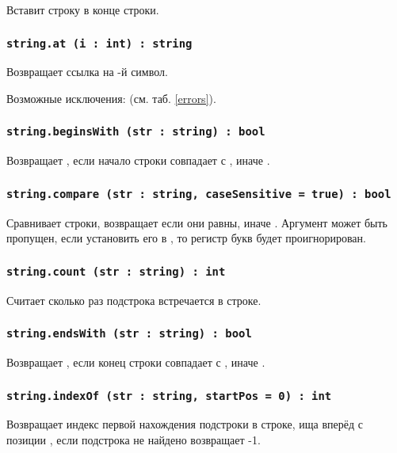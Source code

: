 Вставит строку  в конце строки.

\subsubsection{\lstinline|string.at (i : int) : string|}

Возвращает ссылка на -й символ.

Возможные исключения:  (см. таб. \ref{errors}).

\subsubsection{\lstinline|string.beginsWith (str : string) : bool|}

Возвращает \true{}, если начало строки совпадает с , иначе \false{}.

\subsubsection{\lstinline|string.compare (str : string, caseSensitive = true) : bool|}

Сравнивает строки, возвращает \true{} если они равны, иначе \false{}. Аргумент  может быть пропущен, если установить его в \false{}, то регистр букв будет проигнорирован.

\subsubsection{\lstinline|string.count (str : string) : int|}

Считает сколько раз подстрока  встречается в строке.

\subsubsection{\lstinline|string.endsWith (str : string) : bool|}

Возвращает \true{}, если конец строки совпадает с , иначе \false{}.

\subsubsection{\lstinline|string.indexOf (str : string, startPos = 0) : int|}

Возвращает индекс первой нахождения подстроки  в строке, ища вперёд с позиции , если подстрока не найдено возвращает -1.

